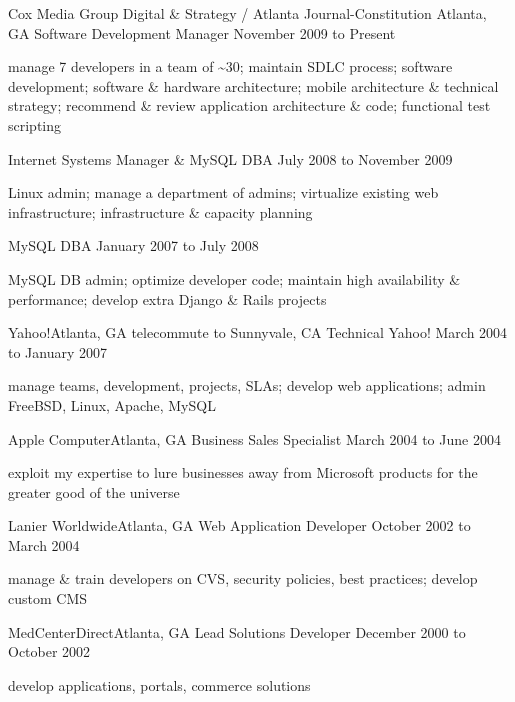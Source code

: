 \documentclass[10pt]{article}
\begin{document}
\sectionheader
{Cox Media Group Digital \& Strategy / Atlanta Journal-Constitution}
{Atlanta, GA}
{Software Development Manager}
{November 2009 to Present}
\begin{longtext}
manage 7 developers in a team of \~{}30;
maintain SDLC process;
software development;
software \& hardware architecture;
mobile architecture \& technical strategy;
recommend \& review application architecture \& code;
functional test scripting

\end{longtext}
\sectionsub
{Internet Systems Manager \& MySQL DBA}
{July 2008 to November 2009}
\begin{longtext}
Linux admin;
manage a department of admins;
virtualize existing web infrastructure;
infrastructure \& capacity planning
\end{longtext}
\sectionsub
{MySQL DBA}
{January 2007 to July 2008}
\begin{longtext}
MySQL DB admin;
optimize developer code;
maintain high availability \& performance;
develop extra Django \& Rails projects
\end{longtext}

\sectionheader
{Yahoo!}{Atlanta, GA telecommute to Sunnyvale, CA}
{Technical Yahoo!}
{March 2004 to January 2007}
\begin{longtext}
manage teams, development, projects, SLAs;
develop web applications;
admin FreeBSD, Linux, Apache, MySQL
\end{longtext}

\sectionheader
{Apple Computer}{Atlanta, GA}
{Business Sales Specialist}
{March 2004 to June 2004}
\begin{longtext}
exploit my expertise to lure businesses away from Microsoft products for the greater good of the universe
\end{longtext}

\sectionheader
{Lanier Worldwide}{Atlanta, GA}
{Web Application Developer}
{October 2002 to March 2004}
\begin{longtext}
manage \& train developers on CVS, security policies, best practices;
develop custom CMS
\end{longtext}

\sectionheader
{MedCenterDirect}{Atlanta, GA}
{Lead Solutions Developer}
{December 2000 to October 2002}
\begin{longtext}
develop applications, portals, commerce solutions
\end{longtext}
\end{document}
